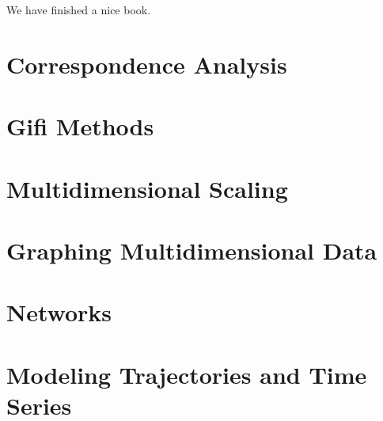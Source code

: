 \documentclass[
]{book}
\begin{document}
We have finished a nice book.

\hypertarget{correspondence-analysis}{%
\chapter{Correspondence Analysis}\label{correspondence-analysis}}

\hypertarget{gifi-methods}{%
\chapter{Gifi Methods}\label{gifi-methods}}

\hypertarget{multidimensional-scaling}{%
\chapter{Multidimensional Scaling}\label{multidimensional-scaling}}

\hypertarget{graphing-multidimensional-data}{%
\chapter{Graphing Multidimensional Data}\label{graphing-multidimensional-data}}

\hypertarget{networks}{%
\chapter{Networks}\label{networks}}

\hypertarget{modeling-trajectories-and-time-series}{%
\chapter{Modeling Trajectories and Time Series}\label{modeling-trajectories-and-time-series}}

  
\end{document}
